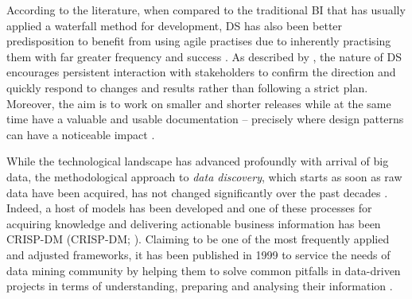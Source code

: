 According to the literature, when compared to the traditional \ac{BI} that has usually applied a waterfall method for development, \ac{DS} has also been better predisposition to benefit from using agile practises due to inherently practising them with far greater frequency and success \parencites{Collier2011}{krawatzeck2013agile}.
As described by \textcite{Larson2016AScience}, the nature of \ac{DS} encourages persistent interaction with stakeholders to confirm the direction and quickly respond to changes and results rather than following a strict plan. 
Moreover, the aim is to work on smaller and shorter releases while at the same time have a valuable and usable documentation -- precisely where design patterns can have a noticeable impact \parencite{Larson2016AScience}. 

While the technological landscape has advanced profoundly with arrival of big data, the methodological approach to \emph{data discovery}, which starts as soon as raw data have been acquired, has not changed significantly over the past decades \parencites{Larson2016AScience}{Lara2015BigData}. 
Indeed, a host of models has been developed and one of these processes  for acquiring knowledge and delivering actionable business information has been \acl{CRISP-DM} (CRISP-DM; \cite[56]{Provost201351}).
Claiming to be one of the most frequently applied and adjusted frameworks, it has been published in 1999 to service the needs of data mining community by helping them to solve common pitfalls in data-driven projects in terms of understanding, preparing and analysing their information \parencites{PeteChapman2004CRISP-DMGuide}{ThomasZeutschler2016ITAnalytics}{Firtik2017VizualizaceNastroju}{GarrettGrolemund2017RData}.

